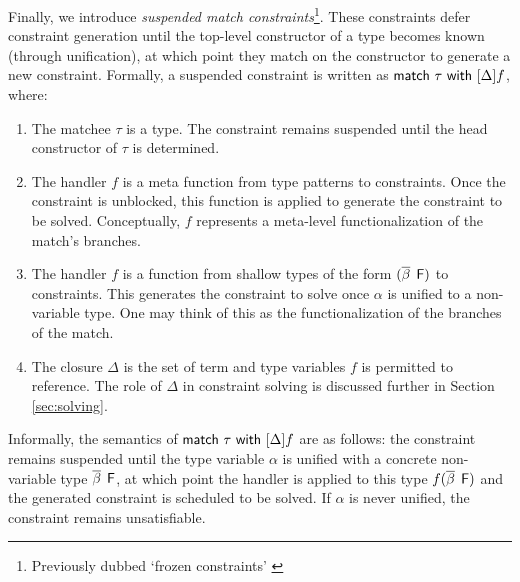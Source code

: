 \documentclass[acmsmall,screen,nonacm]{acmart}
\begin{document}

Finally, we introduce \textit{suspended match constraints}\footnote{Previously dubbed `frozen constraints' \citep{TODO}}.  
These constraints defer constraint generation until the top-level constructor of a 
type becomes known (through unification), at which point they match on the constructor 
to generate a new constraint. Formally, a suspended constraint is written as 
$\mathsf{match} ~ \tau ~ \mathsf{with} ~ [ \Delta ] f$, where:
\begin{enumerate}
\item
  The matchee $\tau$ is a type. The constraint remains suspended until the head constructor of $\tau$ is determined. 
\item 
  The handler $f$ is a meta function from type patterns to constraints.
  Once the constraint is unblocked, this function is applied to generate the constraint to be solved. 
  Conceptually, $f$ represents a meta-level functionalization of the match's branches.
\item
  The handler $f$ is a function from shallow types of the form $(\overline{\beta} \mathop{}\mathrel{\mathsf{F}})$ to constraints.
  This
  generates the constraint to solve once $\alpha$ is unified to a non-variable type. One may think
  of this as the functionalization of the branches of the match.
\item
  The closure $\Delta$ is the set of term and type variables $f$ is permitted to reference. 
  The role of $\Delta$ in constraint solving is discussed further in Section \ref{sec:solving}. 
\end{enumerate}

Informally, the semantics of $\mathsf{match} ~ \tau ~ \mathsf{with} ~ [ \Delta ] f$ are as follows: the
constraint remains suspended until the type variable $\alpha$ is unified
with a concrete non-variable type $\overline{\beta} \mathop{}\mathrel{\mathsf{F}}$, at which point
the handler is applied to this type $f(\overline{\beta} \mathop{}\mathrel{\mathsf{F}})$ and the
generated constraint is scheduled to be solved. If $\alpha$ is never
unified, the constraint remains unsatisfiable.

\end{document}
